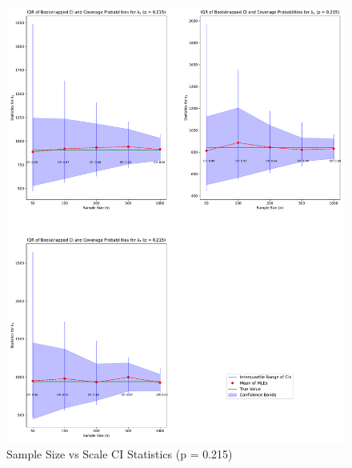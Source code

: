 \documentclass[
]{article}
\begin{document}
\begin{figure}

{\centering \includegraphics{image/plot-n-vs-stats-p215-scale} 

}

\caption{Sample Size vs Scale CI Statistics (p = 0.215)}\label{fig:samp-size-n-vs-stats-215-scale}
\end{figure}
\end{document}
